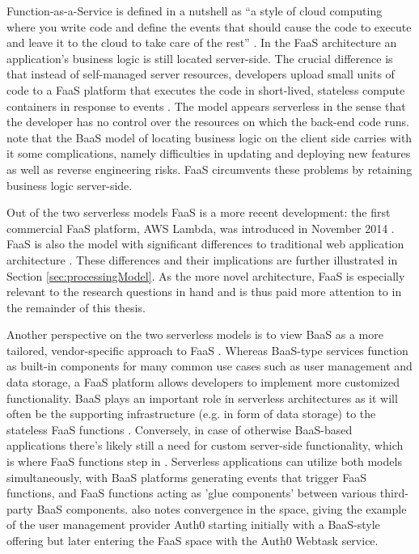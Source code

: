 Function-as-a-Service is defined in a nutshell as ``a style of cloud computing where you write code and define the events that should cause the code to execute and leave it to the cloud to take care of the rest'' \parencite{gannon17cloudNative}. In the FaaS architecture an application's business logic is still located server-side. The crucial difference is that instead of self-managed server resources, developers upload small units of code to a FaaS platform that executes the code in short-lived, stateless compute containers in response to events \parencite{robert2016serverlessarchitectures}. The model appears serverless in the sense that the developer has no control over the resources on which the back-end code runs. \textcite{albuquerque17faaspaas} note that the BaaS model of locating business logic on the client side carries with it some complications, namely difficulties in updating and deploying new features as well as reverse engineering risks. FaaS circumvents these problems by retaining business logic server-side.

Out of the two serverless models FaaS is a more recent development: the first commercial FaaS platform, AWS Lambda, was introduced in November 2014 \parencite{awslambda0218}.
FaaS is also the model with significant differences to traditional web application architecture \parencite{robert2016serverlessarchitectures}. These differences and their implications are further illustrated in Section \ref{sec:processingModel}. As the more novel architecture, FaaS is especially relevant to the research questions in hand and is thus paid more attention to in the remainder of this thesis.

Another perspective on the two serverless models is to view BaaS as a more tailored, vendor-specific approach to FaaS \parencite{van2017spec}. Whereas BaaS-type services function as built-in components for many common use cases such as user management and data storage, a FaaS platform allows developers to implement more customized functionality. BaaS plays an important role in serverless architectures as it will often be the supporting infrastructure (e.g. in form of data storage) to the stateless FaaS functions \parencite{cncf18serverlessWG}. Conversely, in case of otherwise BaaS-based applications there's likely still a need for custom server-side functionality, which is where FaaS functions step in \parencite{robert2016serverlessarchitectures}. Serverless applications can utilize both models simultaneously, with BaaS platforms generating events that trigger FaaS functions, and FaaS functions acting as 'glue components' between various third-party BaaS components. \textcite{robert2016serverlessarchitectures} also notes convergence in the space, giving the example of the user management provider Auth0 starting initially with a BaaS-style offering but later entering the FaaS space with the Auth0 Webtask service.

